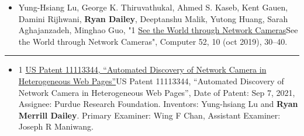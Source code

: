 \documentclass[10pt]{article}
\newlength{\cvcolumngapwidth}
\newlength{\cvleftcolumnwidth}
\newlength{\cvrightcolumnwidth}
\newcommand{\cvsectionstyle}[1]{{\normalsize\cvsectionfont\textcolor{cvsectioncolor}{#1}}}
\newcommand{\cvdurationstyle}[1]{{\small\cvdurationfont\textcolor{cvdurationcolor}{#1}}}
\newlength{\cvafteritemskipamount}
\newlength{\cvaftersectionskipamount}
\newlength{\cvparskip}
\newcommand{\cvsection}[1]{
    \begin{minipage}[t]{\cvleftcolumnwidth}
        \raggedleft\cvsectionstyle{#1}
    \end{minipage}%
    \hspace{\cvcolumngapwidth}%
    \begin{minipage}[t]{\cvrightcolumnwidth}
        \textcolor{cvrulecolor}{\rule{\cvrightcolumnwidth}{0.3mm}}
    \end{minipage}

    \vspace{\cvaftersectionskipamount}
}
\newcommand{\cvitem}[2]{
    \begin{minipage}[t]{\cvleftcolumnwidth}
        \raggedleft #1
    \end{minipage}%
    \hspace{\cvcolumngapwidth}%
    \begin{minipage}[t]{\cvrightcolumnwidth}
        \setlength{\parskip}{\cvparskip} #2
    \end{minipage}

    \vspace{\cvafteritemskipamount}
}
\def\online{1}
\begin{document}
{\begin{itemize}[leftmargin=*]
        \item Yung-Hsiang Lu, George K. Thiruvathukal, Ahmed S. Kaseb, Kent Gauen, Damini Rijhwani, \textbf{Ryan Dailey}, Deeptanshu Malik, Yutong Huang, Sarah Aghajanzadeh, Minghao Guo, "\if\online1 \href{https://arxiv.org/pdf/1904.06775.pdf}{See the World through Network Cameras}\else See the World through Network Cameras\fi", Computer 52, 10 (oct 2019), 30–40.
    \end{itemize}
}

\cvsection{PATENTS}

\cvitem{
    \cvdurationstyle{}
}{
    \begin{itemize}[leftmargin=*]
        \item \if\online1 \href{https://patents.google.com/patent/US20200327174A1/en}{US Patent 11113344, “Automated Discovery of Network Camera in Heterogeneous Web Pages”}\else US Patent 11113344, “Automated Discovery of Network Camera in Heterogeneous Web Pages”\fi, Date of Patent: Sep 7, 2021, Assignee: Purdue Research Foundation. Inventors: Yung-hsiang Lu and \textbf{Ryan Merrill Dailey}. Primary Examiner: Wing F Chan, Assistant Examiner: Joseph R Maniwang.
    \end{itemize}
}
\end{document}
